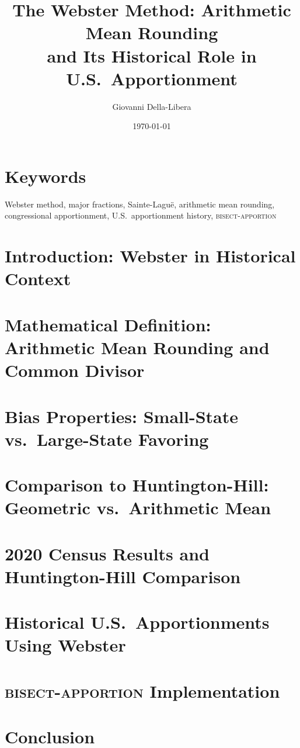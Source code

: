 \documentclass[12pt]{article}
\title{\textbf{The Webster Method: Arithmetic Mean Rounding\\
and Its Historical Role in U.S.\ Apportionment}}
\author{Giovanni Della-Libera}
\date{\today}
\begin{document}
\maketitle

\begin{abstract}

\end{abstract}

\section*{Keywords}
Webster method, major fractions, Sainte-Lagu\"e, arithmetic mean rounding,
congressional apportionment, U.S.\ apportionment history,
\textsc{bisect-apportion}

\section{Introduction: Webster in Historical Context}


\section{Mathematical Definition: Arithmetic Mean Rounding and Common Divisor}


\section{Bias Properties: Small-State vs.\ Large-State Favoring}


\section{Comparison to Huntington-Hill: Geometric vs.\ Arithmetic Mean}


\section{2020 Census Results and Huntington-Hill Comparison}


\section{Historical U.S.\ Apportionments Using Webster}


\section{\textsc{bisect-apportion} Implementation}


\section{Conclusion}




\end{document}
